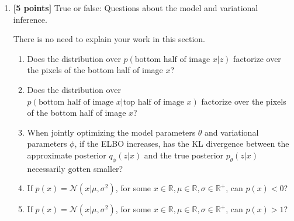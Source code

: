 \documentclass{article}
\begin{document}
\begin{enumerate}[label=(\alph*)]
	\item {\bf [5 points]} True or false: Questions about the model and variational inference.
	
	There is no need to explain your work in this section.

\begin{enumerate}[label=(\alph*)]
	\item Does the distribution over $p(\text{bottom half of image $x$} | z)$ factorize over the pixels of the bottom half of image $x$?
	\item Does the distribution over $p(\text{bottom half of image $x$} | \text{top half of image $x$})$ factorize over the pixels of the bottom half of image $x$?
	\item When jointly optimizing the model parameters $\theta$ and variational parameters $\phi$, if the ELBO increases, has the KL divergence between the approximate posterior $q_\phi(z|x)$ and the true posterior $p_\theta(z|x)$ necessarily gotten smaller?
	\item If $p(x) = \mathcal{N}(x | \mu, \sigma^2)$, for some $x \in \mathbb{R}, \mu \in \mathbb{R}, \sigma \in \mathbb{R}^+$, can $p(x) < 0$?
	\item If $p(x) = \mathcal{N}(x | \mu, \sigma^2)$, for some $x \in \mathbb{R}, \mu \in \mathbb{R}, \sigma \in \mathbb{R}^+$, can $p(x) > 1$?
\end{enumerate}


\end{enumerate}
\end{document}
